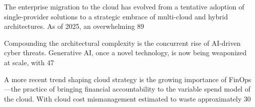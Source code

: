 The enterprise migration to the cloud has evolved from a tentative adoption of single-provider solutions to a strategic embrace of multi-cloud and hybrid architectures. As of 2025, an overwhelming 89%

Compounding the architectural complexity is the concurrent rise of AI-driven cyber threats. Generative AI, once a novel technology, is now being weaponized at scale, with 47%

A more recent trend shaping cloud strategy is the growing importance of FinOps—the practice of bringing financial accountability to the variable spend model of the cloud. With cloud cost mismanagement estimated to waste approximately 30%


